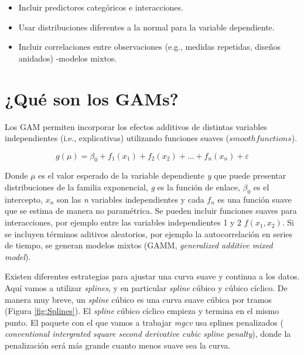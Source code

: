 \documentclass[
]{book}
\providecommand{\tightlist}{%
  \setlength{\itemsep}{0pt}\setlength{\parskip}{0pt}}
\begin{document}
\begin{itemize}
\tightlist
\item
  Incluir predictores categóricos e interacciones.
\item
  Usar distribuciones diferentes a la normal para la variable dependiente.
\item
  Incluir correlaciones entre observaciones (e.g., medidas repetidas, diseños anidados) -modelos mixtos.
\end{itemize}

\hypertarget{quuxe9-son-los-gams}{%
\section{¿Qué son los GAMs?}\label{quuxe9-son-los-gams}}

Los GAM permiten incorporar los efectos additivos de distintas variables independientes (i.e., explicativas) utilizando funciones suaves (\(smooth functions\)).

\[
g(\mu) = \beta_0 + f_{1}(x_{1}) + f_{2}(x_{2}) + ... + f_{n}(x_{n}) + \varepsilon
\]

Donde \(\mu\) es el valor esperado de la variable dependiente \emph{y} que puede presentar distribuciones de la familia exponencial, \emph{g} es la función de enlace, \(\beta_0\) es el intercepto, \(x_{n}\) son las \emph{n} variables independientes y cada \(f_{n}\) es una función suave que se estima de manera no paramétrica. Se pueden incluir funciones suaves para interacciones, por ejemplo entre las variables independientes 1 y 2 \(f(x_{1},x_{2})\). Si se incluyen términos aditivos aleatorios, por ejemplo la autocorrelación en series de tiempo, se generan modelos mixtos (GAMM, \emph{generalized additive mixed model}).

Existen diferentes estrategias para ajustar una curva suave y continua a los datos. Aquí vamos a utilizar \emph{splines}, y en particular \emph{spline} cúbico y cúbico cíclico. De manera muy breve, un \emph{spline} cúbico es una curva suave cúbica por tramos (Figura \ref{fig:Splines}). El \emph{spline} cúbico cíclico empieza y termina en el mismo punto. El paquete con el que vamos a trabajar \emph{mgcv} \citep{wood2017} usa splines penalizados ( \emph{conventional intergrated square second derivative cubic spline penalty}), donde la penalización será más grande cuanto menos suave sea la curva.
\end{document}
